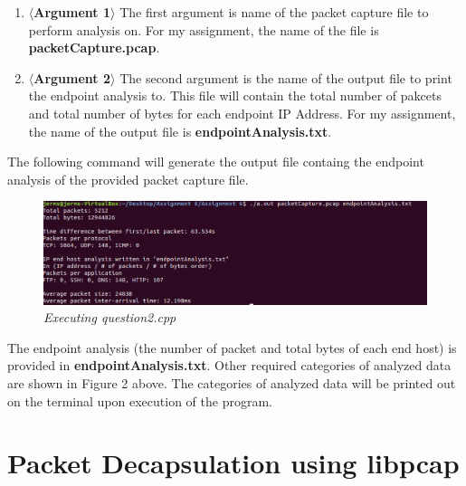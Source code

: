 \documentclass[a4paper,11pt]{article}
\begin{document}
\begin{enumerate}
\item \textbf{$\langle$Argument 1$\rangle$}
\newline The first argument is name of the packet capture file to perform analysis on. For my assignment, the name of the file is \textbf{packetCapture.pcap}.
\item \textbf{$\langle$Argument 2$\rangle$}
\newline The second argument is the name of the output file to print the endpoint analysis to. This file will contain the total number of pakcets and total number of bytes for each endpoint IP Address. For my assignment, the name of the output file is \textbf{endpointAnalysis.txt}.
\end{enumerate}
The following command will generate the output file containg the endpoint analysis of the provided packet capture file.
\newline
\begin{figure}[h!]
	\includegraphics[width = 16cm]{question2}
	\caption{\textit{Executing question2.cpp}}
\end{figure}
\newline
The endpoint analysis (the number of packet and total bytes of each end host) is provided in \textbf{endpointAnalysis.txt}. Other required categories of analyzed data are shown in Figure 2 above. The categories of analyzed data will be printed out on the terminal upon execution of the program.

\section{Packet Decapsulation using libpcap}
\end{document}

